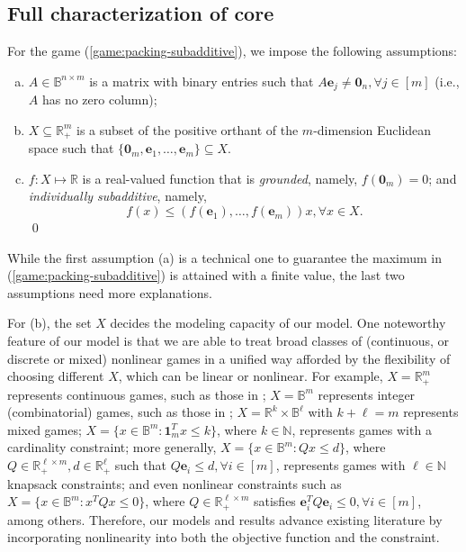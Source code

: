 \documentclass[11pt]{article}\usepackage[]{graphicx}\usepackage[]{xcolor}
\begin{document}
\subsection{Full characterization of core}\label{subsec:nl-game-main-result}


For the game (\ref{game:packing-subadditive}), we impose the following assumptions: 
\begin{enumerate}[(a)]
\item $A\in \mathbb{B}^{n\times m}$ is a matrix with binary entries such that $A\mathbf{e}_j\ne \mathbf{0}_n, \forall j\in [m]$ (i.e., $A$ has no zero column);
\item $X\subseteq \mathbb{R}^m_{+}$ is a subset of the positive orthant of the $m$-dimension Euclidean space such that $\{\mathbf{0}_m, \mathbf{e}_1,\dots, \mathbf{e}_m\}\subseteq X$. 
\item $f: X\mapsto \mathbb{R}$ is a real-valued function that is \emph{grounded}, namely, $f\left(\mathbf{0}_m\right)=0$; and \emph{individually subadditive}, namely,  
\begin{equation}\label{eq:ind-sub-rhs}
f(x)\le (f(\mathbf{e}_1), \dots, f(\mathbf{e}_m))x, \forall x\in X.
\end{equation}
\qed
\end{enumerate}

While the first assumption (a) is a technical one to guarantee the maximum in (\ref{game:packing-subadditive}) is attained with a finite value, the last two assumptions need more explanations.

For (b), the set $X$ decides the modeling capacity of our model. One noteworthy feature of our model is that we are able to treat broad classes of (continuous, or discrete or mixed) nonlinear games in a unified way afforded by the flexibility of choosing different $X$, which can be linear or nonlinear. For example, $X=\mathbb{R}^m_{+}$ represents continuous games, such as those in \citep{samet1984core}; $X=\mathbb{B}^m$ represents integer (combinatorial) games, such as those in \citep{deng1999algorithmic}; $X=\mathbb{R}^k\times \mathbb{B}^{\ell}$ with $k+\ell=m$ represents mixed games; $X=\{x\in \mathbb{B}^m: \mathbf{1}_m^Tx\le k\}$, where $k\in \mathbb{N}$, represents games with a cardinality constraint; more generally, $X=\{x\in \mathbb{B}^m: Qx\le d\}$, where $Q\in \mathbb{R}^{\ell\times m}_{+}, d\in \mathbb{R}^{\ell}_{+}$ such that $Q\mathbf{e}_i\le d, \forall i\in [m]$, represents games with $\ell\in\mathbb{N}$ knapsack constraints; and even nonlinear constraints such as  $X=\{x\in \mathbb{B}^m: x^TQx\le 0\}$, where $Q\in \mathbb{R}^{\ell\times m}_{+}$ satisfies $\mathbf{e}_i^TQ\mathbf{e}_i\le 0, \forall i\in [m]$, among others. Therefore, our models and results advance existing literature by incorporating nonlinearity into both the objective function and the constraint. 
\end{document}
